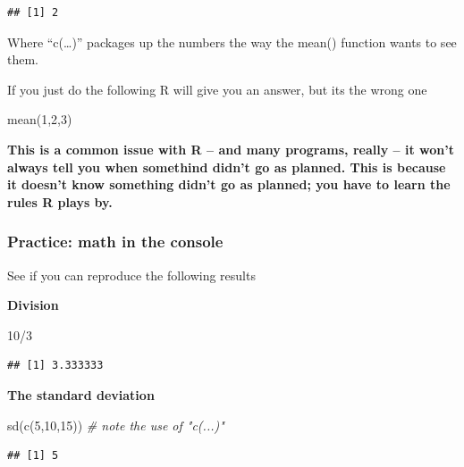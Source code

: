 \documentclass[
]{book}
\newenvironment{Shaded}{\begin{snugshade}}{\end{snugshade}}
\newcommand{\CommentTok}[1]{\textcolor[rgb]{0.56,0.35,0.01}{\textit{#1}}}
\newcommand{\DecValTok}[1]{\textcolor[rgb]{0.00,0.00,0.81}{#1}}
\newcommand{\FunctionTok}[1]{\textcolor[rgb]{0.00,0.00,0.00}{#1}}
\newcommand{\NormalTok}[1]{#1}
\newcommand{\SpecialCharTok}[1]{\textcolor[rgb]{0.00,0.00,0.00}{#1}}
\begin{document}
\begin{verbatim}
## [1] 2
\end{verbatim}

Where ``c(\ldots)'' packages up the numbers the way the mean() function wants to see them.

If you just do the following R will give you an answer, but its the wrong one

\begin{Shaded}
\begin{Highlighting}[]
\FunctionTok{mean}\NormalTok{(}\DecValTok{1}\NormalTok{,}\DecValTok{2}\NormalTok{,}\DecValTok{3}\NormalTok{)}
\end{Highlighting}
\end{Shaded}

\textbf{This is a common issue with R -- and many programs, really -- it won't always tell you when somethind didn't go as planned. This is because it doesn't know something didn't go as planned; you have to learn the rules R plays by.}

\hypertarget{practice-math-in-the-console}{%
\subsubsection{Practice: math in the console}\label{practice-math-in-the-console}}

See if you can reproduce the following results

\textbf{Division}

\begin{Shaded}
\begin{Highlighting}[]
\DecValTok{10}\SpecialCharTok{/}\DecValTok{3}
\end{Highlighting}
\end{Shaded}

\begin{verbatim}
## [1] 3.333333
\end{verbatim}

\textbf{The standard deviation}

\begin{Shaded}
\begin{Highlighting}[]
\FunctionTok{sd}\NormalTok{(}\FunctionTok{c}\NormalTok{(}\DecValTok{5}\NormalTok{,}\DecValTok{10}\NormalTok{,}\DecValTok{15}\NormalTok{)) }\CommentTok{\# note the use of "c(...)"}
\end{Highlighting}
\end{Shaded}

\begin{verbatim}
## [1] 5
\end{verbatim}
\end{document}

